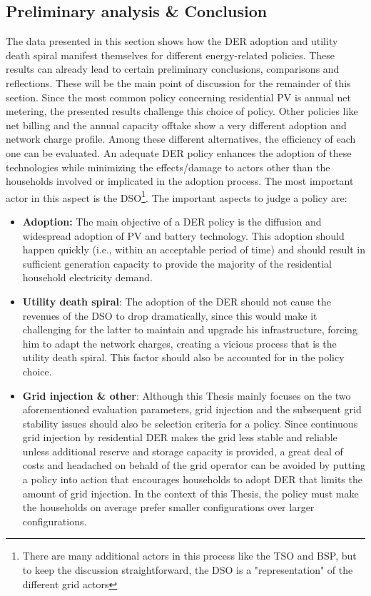 \subsection{Preliminary analysis \& Conclusion}
The data presented in this section shows how the DER adoption and utility death spiral manifest themselves for different energy-related policies. These results can already lead to certain preliminary conclusions, comparisons and reflections. These will be the main point of discussion for the remainder of this section. 
\newline \newline \noindent
Since the most common policy concerning residential PV is annual net metering, the presented results challenge this choice of policy. Other policies like net billing and the annual capacity offtake show a very different adoption and network charge profile. Among these different alternatives, the efficiency of each one can be evaluated. An adequate DER policy enhances the adoption of these technologies while minimizing the effects/damage to actors other than the households involved or implicated in the adoption process. The most important actor in this aspect is the DSO\footnote{There are many additional actors in this process like the TSO and BSP, but to keep the discussion straightforward, the DSO is a "representation" of the different grid actors}. The important aspects to judge a policy are:
\begin{itemize}
    \item \textbf{Adoption:} The main objective of a DER policy is the diffusion and widespread adoption of PV and battery technology. This adoption should happen quickly (i.e., within an acceptable period of time) and should result in sufficient generation capacity to provide the majority of the residential household electricity demand. 
    \item \textbf{Utility death spiral}: The adoption of the DER should not cause the revenues of the DSO to drop dramatically, since this would make it challenging for the latter to maintain and upgrade his infrastructure, forcing him to adapt the network charges, creating a vicious process that is the utility death spiral. This factor should also be accounted for in the policy choice. 
    \item \textbf{Grid injection \& other}: Although this Thesis mainly focuses on the two aforementioned evaluation parameters, grid injection and the subsequent grid stability issues should also be selection criteria for a policy. Since continuous grid injection by residential DER makes the grid less stable and reliable unless additional reserve and storage capacity is provided, a great deal of costs and headached on behald of the grid operator can be avoided by putting a policy into action that encourages households to adopt DER that limits the amount of grid injection. In the context of this Thesis, the policy must make the households on average prefer smaller configurations over larger configurations.
\end{itemize}
